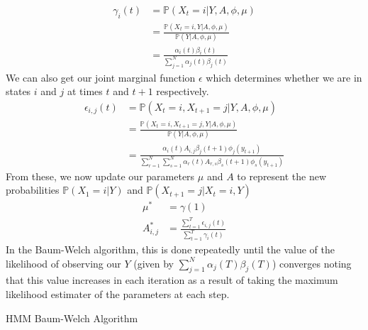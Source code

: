 \documentclass[12pt]{article}
\makeatletter
\newcommand{\Prob}{\mathbb{P}}
\def\BState{\State\hskip-\ALG@thistlm}
\makeatother
\begin{document}
\begin{align*}
\gamma_i(t) &= \Prob (X_t = i \vert Y,A,\phi,\mu)\\
&= \frac{\Prob(X_t=i,Y \vert A,\phi,\mu)}{\Prob(Y\vert A,\phi,\mu)}\\
&= \frac{\alpha_i(t)\beta_i(t)}{\sum_{j=1}^N \alpha_j(t)\beta_j(t)}
\end{align*}
We can also get our joint marginal function $\epsilon$ which determines whether we are in states $i$ and $j$ at times $t$ and $t+1$ respectively.
\begin{align*}
\epsilon_{i,j}(t) &= \Prob (X_t = i,X_{t+1}=j\vert Y,A,\phi,\mu)\\
&= \frac{\Prob(X_t = i,X_{t+1}=j,Y \vert A,\phi,\mu)}{\Prob(Y\vert A,\phi,\mu)}\\
&= \frac{\alpha_i(t)A_{i,j}\beta_j(t+1)\phi_j(y_{t+1})}{\sum_{r=1}^N\sum_{s=1}^N \alpha_r(t)A_{r,s}\beta_s(t+1)\phi_s(y_{t+1})}
\end{align*}
\FloatBarrier
From these, we now update our parameters $\mu$ and $A$ to represent the new probabilities $\Prob(X_1 = i \vert Y)$ and $\Prob(X_{t+1} = j \vert X_{t} = i,Y)$
\begin{align*}
    \mu^{\ast} &= \gamma(1)\\
    A_{i,j}^{\ast} &= \frac{\sum_{t=1}^T\epsilon_{i,j}(t)}{\sum_{t=1}^T\gamma_i(t)}
\end{align*}
In the Baum-Welch algorithm, this is done repeatedly until the value of the likelihood of observing our $Y$ (given by $\sum_{j=1}^N \alpha_j(T)\beta_j(T)$) converges noting that this value increases in each iteration as a result of taking the maximum likelihood estimater of the parameters at each step.\\
\begin{algorithm}
\caption{HMM Baum-Welch Algorithm}
\end{algorithm}
\FloatBarrier
\end{document}
